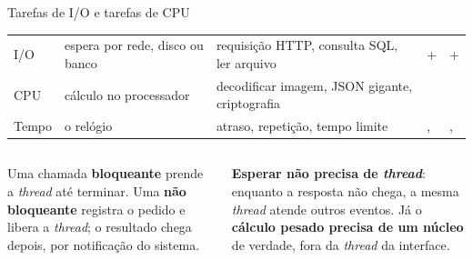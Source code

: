 \begin{frame}{Tarefas de I/O e tarefas de CPU}
  \scriptsize
  \begin{tabularx}{\textwidth}{@{}l L L l l@{}}
    \toprule
     &  &  &  &  \\
    \midrule
    I/O & espera por rede, disco ou banco & requisição HTTP, consulta SQL, ler arquivo &  +  &  +  \\
    CPU & cálculo no processador & decodificar imagem, JSON gigante, criptografia &  &  \\
    Tempo & o relógio & atraso, repetição, tempo limite & ,  & ,  \\
    \bottomrule
  \end{tabularx}
  \normalsize
  \vspace{4pt}
  \begin{columns}[T]
    \begin{column}{0.49\textwidth}
      \begin{definicao}
        Uma chamada \textbf{bloqueante} prende a \emph{thread} até terminar. Uma \textbf{não bloqueante} registra o pedido e libera a \emph{thread}; o resultado chega depois, por notificação do sistema.
      \end{definicao}
    \end{column}
    \begin{column}{0.49\textwidth}
      \begin{conceito}
        \textbf{Esperar não precisa de \emph{thread}}: enquanto a resposta não chega, a mesma \emph{thread} atende outros eventos. Já o \textbf{cálculo pesado precisa de um núcleo} de verdade, fora da \emph{thread} da interface.
      \end{conceito}
    \end{column}
  \end{columns}
\end{frame}


